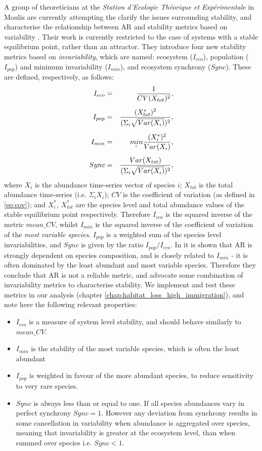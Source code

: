 A group of theoreticians at the \emph{Station d'Ecologie Th\'eorique et Exp\'erimentale} in Moulis are currently attempting the clarify the issues surrounding stability, and characterise the relationship between AR and stability metrics based on variability \cite{arnoldi2015,montoya2016invariability}. Their work is currently restricted to the case of systems with a stable equilibrium point, rather than an attractor. They introduce four new stability metrics based on \emph{invariability}, which are named: ecosystem ($I_{eco}$), population ($I_{pop}$) and minimum invariability ($I_{min}$), and ecosystem synchrony ($Sync$). These are defined, respectively, as follows:
\begin{eqnarray}
I_{eco} &=& \frac{1}{CV(X_{tot})^2}, \\[5pt] 
I_{pop} &=& \frac{(X_{tot}^*)^2}{(\Sigma_i \sqrt{Var(X_i)})^2}, \\[5pt]
I_{min} &=& \underaccent{i}{min} \frac{(X_i^*)^2}{Var(X_i)}, \\[5pt]
Sync    &=& \frac{Var(X_{tot})}{(\Sigma_i \sqrt{Var(X_i)})^2},\label{eq:def_eco_sync}
\end{eqnarray}
where $X_i$ is the abundance time-series vector of species $i$; $X_{tot}$ is the total abundance time-series (i.e.  $\Sigma_i X_i$);  $CV$ is the coefficient of variation (as defined in \eqref{eq:cov}); and $X_i^*$, $X_{tot}^*$ are the species level and total abundance values of the stable equilibrium point respectively. Therefore $I_{eco}$ is the squared inverse of the metric $mean\_CV$, whilst $I_{min}$ is the squared inverse of the coefficient of variation of the \emph{most variable species}. $I_{pop}$ is a weighted sum of the species level invariabilities, and $Sync$ is given by the ratio $I_{pop} / I_{eco}$. In \cite{montoya2016invariability} it is shown that AR is strongly dependent on species composition, and is closely related to $I_{min}$ - it is often dominated by the least abundant and most variable species. Therefore they conclude that AR is not a reliable metric, and advocate some combination of invariability metrics to characterise stability. We implement and test these metrics in our analysis (chapter \ref{chap:habitat_loss_high_immigration}), and note here the following relevant properties:

\begin{itemize}
	\item $I_{eco}$ is a measure of system level stability, and should behave similarly to $mean\_CV$.
	\item $I_{min}$ is the stability of the most variable species, which is often the least abundant \cite{montoya2016invariability}
	\item $I_{pop}$ is weighted in favour of the more abundant species, to reduce sensitivity to very rare species.
	\item $Sync$ is always less than or equal to one. If all species abundances vary in perfect synchrony $Sync=1$. However any deviation from synchrony results in some cancellation in variability when abundance is aggregated over species, meaning that invariability is greater at the ecosystem level, than when summed over species i.e. $Sync<1$.
\end{itemize}


